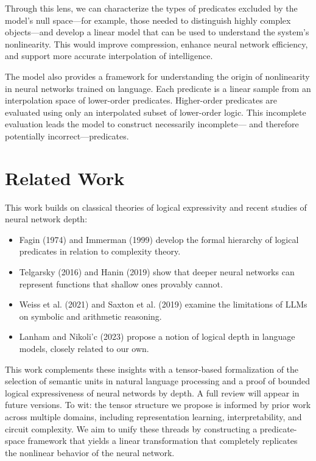 \documentclass[12pt]{article}
\theoremstyle{plain}
\begin{document}
Through this lens, we can characterize the types of predicates
excluded by the model’s null space---for example, those needed 
to distinguish highly complex objects---and develop a linear model
that can be used to understand the system’s nonlinearity. This would 
improve compression, enhance neural network efficiency, and support 
more accurate interpolation of intelligence.

The model also provides a framework for understanding
the origin of nonlinearity in neural networks trained on language.
Each predicate is a linear sample from an interpolation space of lower-order predicates.
Higher-order predicates are evaluated using only an interpolated subset of lower-order logic.
This incomplete evaluation leads the model to construct necessarily incomplete---
and therefore potentially incorrect---predicates.

\section{Related Work}
This work builds on classical theories of logical expressivity and recent studies
of neural network depth:

\begin{itemize}
\item Fagin (1974) and Immerman (1999) develop the formal hierarchy of logical predicates in relation to complexity theory.
\item Telgarsky (2016) and Hanin (2019) show that deeper neural networks can represent functions that shallow ones provably cannot.
\item Weiss et al. (2021) and Saxton et al. (2019) examine the limitations of LLMs on symbolic and arithmetic reasoning.
\item Lanham and Nikoli'c (2023) propose a notion of logical depth in language models, closely related to our own.
\end{itemize}

This work complements these insights with a tensor-based formalization of
the selection of semantic units in natural language processing and a proof of bounded 
logical expressiveness of neural networds by depth. A
full review will appear in future versions. To wit: the tensor structure 
we propose is informed by prior work across multiple domains, including 
representation learning, interpretability, and circuit complexity. We aim 
to unify these threads by constructing a predicate-space framework that 
yields a linear transformation that completely replicates the nonlinear 
behavior of the neural network.
\end{document}
